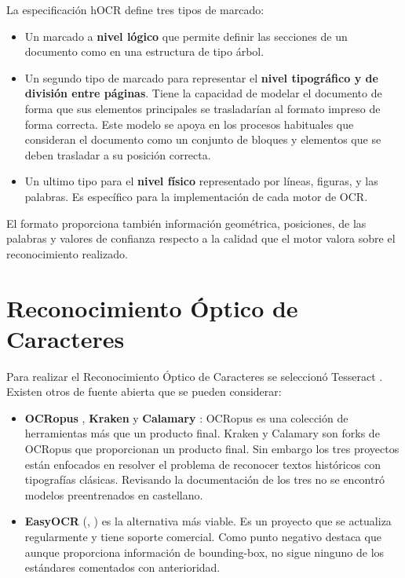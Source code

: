 La especificación hOCR define tres tipos de marcado:

\begin{itemize}
    \item Un marcado a \textbf{nivel lógico} que permite definir las secciones de un documento como en una estructura de tipo árbol.
    \item Un segundo tipo de marcado para representar el \textbf{nivel tipográfico y de división entre páginas}. Tiene la capacidad de modelar el documento de forma  que sus elementos principales se trasladarían al formato impreso de forma correcta. Este modelo se apoya en los procesos habituales que consideran el documento como un conjunto de bloques y elementos que se deben trasladar a su posición correcta.
    \item Un ultimo tipo para el \textbf{nivel físico} representado por líneas, figuras, y las palabras. Es específico para la implementación de cada motor de OCR. 
\end{itemize}

El formato proporciona también información geométrica, posiciones, de las palabras y valores de confianza respecto a la calidad que el motor valora sobre el reconocimiento realizado.

\section{Reconocimiento Óptico de Caracteres}
\label{sec:rec-optico-caracteres}

Para realizar el Reconocimiento Óptico de Caracteres se seleccionó Tesseract \cite{ocr_tesseract_raysmithetal.TesseractocrTesseract2021}. Existen otros de fuente abierta que se pueden considerar:

\begin{itemize}
    \item \textbf{OCRopus} \cite{ocr_ocropus_ocropy_project}, \textbf{Kraken}  y \textbf{Calamary} \cite{ocr_calamari_journal}: OCRopus es una colección de herramientas más que un producto final. Kraken y Calamary son forks de OCRopus que proporcionan un producto final. Sin embargo los tres proyectos están enfocados en resolver el problema de reconocer textos históricos con tipografías clásicas. Revisando la documentación de los tres no se encontró modelos preentrenados en castellano.
    \item \textbf{EasyOCR} (\cite{ocr_easyocr_official}, \cite{ocr_easyocr_project}) es la alternativa más viable. Es un proyecto que se actualiza regularmente y tiene soporte comercial. Como punto negativo destaca que aunque proporciona información de bounding-box, no sigue ninguno de los estándares comentados con anterioridad.
\end{itemize}

